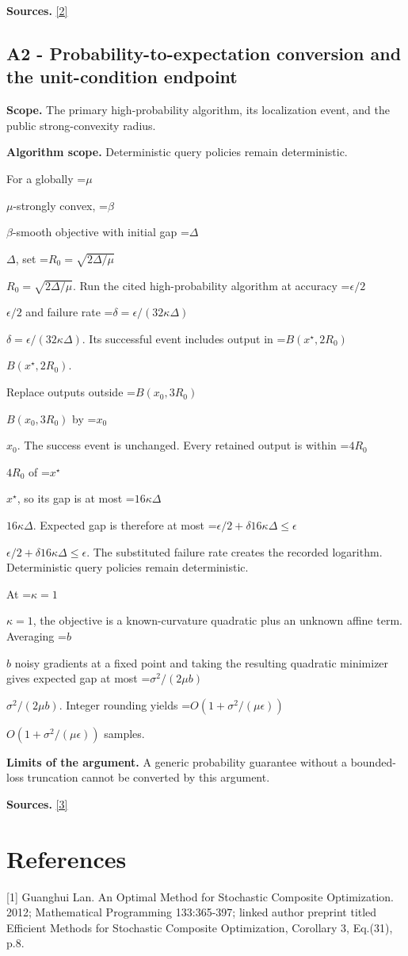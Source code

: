 \documentclass[10pt,a4paper]{article}
\newcommand{\AtlasMath}[1]{\par\begingroup\centering\setbox0=\hbox{$\displaystyle #1$}\ifdim\wd0>1.4\linewidth\typeout{ATLAS WIDE FORMULA: \the\wd0}\fi\ifdim\wd0>\linewidth\resizebox{\linewidth}{!}{\box0}\else\box0\fi\par\endgroup}
\newcommand{\AtlasInlineMath}[1]{\begingroup\setbox0=\hbox{$#1$}\ifdim\wd0>.4\linewidth\endgroup\AtlasMath{#1}\else\endgroup$#1$\fi}
\begin{document}
\textbf{Sources.} \href{https://arxiv.org/pdf/2609.10874}{[2]}

\subsection{A2 - Probability-to-expectation conversion and the unit-condition endpoint}
\textbf{Scope.} The primary high-probability algorithm, its localization event, and the public strong-convexity radius.

\textbf{Algorithm scope.} Deterministic query policies remain deterministic.

For a globally \AtlasInlineMath{\mu}-strongly convex, \AtlasInlineMath{\beta}-smooth objective with initial gap \AtlasInlineMath{\Delta}, set \AtlasInlineMath{R_0=\sqrt{2\Delta/\mu}}. Run the cited high-probability algorithm at accuracy \AtlasInlineMath{\epsilon/2} and failure rate \AtlasInlineMath{\delta=\epsilon/(32\kappa\Delta)}. Its successful event includes output in \AtlasInlineMath{B(x^\star,2R_0)}.

Replace outputs outside \AtlasInlineMath{B(x_0,3R_0)} by \AtlasInlineMath{x_0}. The success event is unchanged. Every retained output is within \AtlasInlineMath{4R_0} of \AtlasInlineMath{x^\star}, so its gap is at most \AtlasInlineMath{16\kappa\Delta}. Expected gap is therefore at most
\AtlasInlineMath{\epsilon/2+\delta16\kappa\Delta\le\epsilon}.
The substituted failure rate creates the recorded logarithm. Deterministic query policies remain deterministic.

At \AtlasInlineMath{\kappa=1}, the objective is a known-curvature quadratic plus an unknown affine term. Averaging \AtlasInlineMath{b} noisy gradients at a fixed point and taking the resulting quadratic minimizer gives expected gap at most \AtlasInlineMath{\sigma^2/(2\mu b)}. Integer rounding yields \AtlasInlineMath{O(1+\sigma^2/(\mu\epsilon))} samples.

\textbf{Limits of the argument.} A generic probability guarantee without a bounded-loss truncation cannot be converted by this argument.

\textbf{Sources.} \href{https://proceedings.mlr.press/v202/sadiev23a/sadiev23a.pdf}{[3]}

\section{References}
[1] Guanghui Lan. An Optimal Method for Stochastic Composite Optimization. 2012; Mathematical Programming 133:365-397; linked author preprint titled Efficient Methods for Stochastic Composite Optimization, Corollary 3, Eq.(31), p.8.
\end{document}
